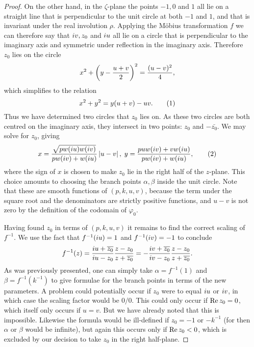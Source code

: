 \begin{lem}
\begin{proof}
On the other hand, in the $ζ$-plane the points $-1,0$ and $1$ all lie on a straight line that is perpendicular to the unit circle at both $-1$ and $1$, and that is invariant under the real involution $ρ$. Applying the Möbius transformation $f$ we can therefore say that $i v, z_0$ and $i u$ all lie on a circle that is perpendicular to the imaginary axis and symmetric under reflection in the imaginary axis. Therefore $z_0$ lies on the circle
\[
x^2 + \left( y - \frac{u+v}{2} \right)^2 = \frac{(u-v)^2}{4},
\]
which simplifies to the relation
\[
x^2 + y^2 = y(u+v) - uv. \labelthis{eqn:z_0_circle}
\]
Thus we have determined two circles that $z_0$ lies on. As these two circles are both centred on the imaginary axis, they intersect in two points: $z_0$ and $-\bar{z_0}$. We may solve for $z_0$, giving
\[
x = \frac{\sqrt{pw(\iu u)w(\iu v)}}{pw(\iu v) + w(\iu u)} \abs{u-v},\; y = \frac{puw(\iu v) + vw(\iu u)}{pw(\iu v) + w(\iu u)},
\labelthis{eqn:formula xy}
\]
where the sign of $x$ is chosen to make $z_0$ lie in the right half of the $z$-plane. This choice amounts to choosing the branch points $α,β$ inside the unit circle. Note that these are smooth functions of $(p,k,u,v)$, because the term under the square root and the denominators are strictly positive functions, and $u-v$ is not zero by the definition of the codomain of $φ_0$.

Having found $z_0$ in terms of $(p,k,u,v)$ it remains to find the correct scaling of $f^{-1}$. We use the fact that $f^{-1}(i u) = 1$ and $f^{-1}(i v) = -1$ to conclude
\[
f^{-1}(z)
=  \frac{i u + \overline{z_0}}{i u - z_0} \frac{z-z_0}{z + \overline{z_0}}
=  -\frac{i v + \overline{z_0}}{i v - z_0} \frac{z-z_0}{z + \overline{z_0}}.
\]
As was previously presented, one can simply take $α = f^{-1}(1)$ and $β = f^{-1}(k^{-1})$ to give formulae for the branch points in terms of the new parameters. A problem could potentially occur if $z_0$ were to equal $i u$ or $i v$, in which case the scaling factor would be $0/0$. This could only occur if $\operatorname{Re} z_0 = 0$, which itself only occurs if $u=v$. But we have already noted that this is impossible. Likewise the formula would be ill-defined if $z_0 = -1$ or $-k^{-1}$ (for then $α$ or $β$ would be infinite), but again this occurs only if $\operatorname{Re} z_0 < 0$, which is excluded by our decision to take $z_0$ in the right half-plane.


\end{proof}
\end{lem}
